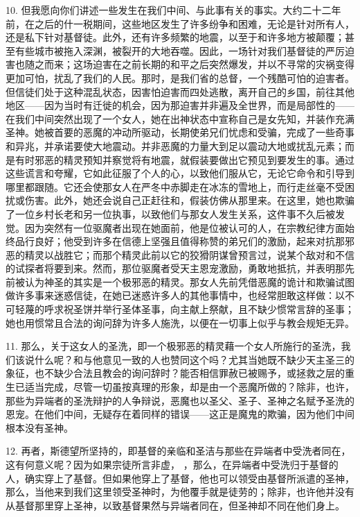 10. 但我愿向你们讲述一些发生在我们中间、与此事有关的事实。大约二十二年前，在之后的什一税期间，这些地区发生了许多纷争和困难，无论是针对所有人，还是私下针对基督徒。此外，还有许多频繁的地震，以至于和许多地方被颠覆；甚至有些城市被拖入深渊，被裂开的大地吞噬。因此，一场针对我们基督徒的严厉迫害也随之而来；这场迫害在之前长期的和平之后突然爆发，并以不寻常的灾祸变得更加可怕，扰乱了我们的人民。那时，是我们省的总督，一个残酷可怕的迫害者。但信徒们处于这种混乱状态，因害怕迫害而四处逃散，离开自己的乡国，前往其他地区——因为当时有迁徙的机会，因为那迫害并非遍及全世界，而是局部性的——在我们中间突然出现了一个女人，她在出神状态中宣称自己是女先知，并装作充满圣神。她被首要的恶魔的冲动所驱动，长期使弟兄们忧虑和受骗，完成了一些奇事和异兆，并承诺要使大地震动。并非恶魔的力量大到足以震动大地或扰乱元素；而是有时邪恶的精灵预知并察觉将有地震，就假装要做出它预见到要发生的事。通过这些谎言和夸耀，它如此征服了个人的心，以致他们服从它，无论它命令和引导到哪里都跟随。它还会使那女人在严冬中赤脚走在冰冻的雪地上，而行走丝毫不受困扰或伤害。此外，她还会说自己正赶往和，假装仿佛从那里来。在这里，她也欺骗了一位乡村长老和另一位执事，以致他们与那女人发生关系，这件事不久后被发觉。因为突然有一位驱魔者出现在她面前，他是位被认可的人，在宗教纪律方面始终品行良好；他受到许多在信德上坚强且值得称赞的弟兄们的激励，起来对抗那邪恶的精灵以战胜它；而那个精灵此前以它的狡猾阴谋曾预言过，说某个敌对和不信的试探者将要到来。然而，那位驱魔者受天主恩宠激励，勇敢地抵抗，并表明那先前被认为神圣的其实是一个极邪恶的精灵。那女人先前凭借恶魔的诡计和欺骗试图做许多事来迷惑信徒，在她已迷惑许多人的其他事情中，也经常胆敢这样做：以不可轻蔑的呼求祝圣饼并举行圣体圣事，向主献上祭献，且不缺少惯常言辞的圣事；她也用惯常且合法的询问辞为许多人施洗，以便在一切事上似乎与教会规矩无异。\par

11. 那么，关于这女人的圣洗，即一个极邪恶的精灵藉一个女人所施行的圣洗，我们该说什么呢？和与他意见一致的人也赞同这个吗？尤其当她既不缺少天主圣三的象征，也不缺少合法且教会的询问辞时？能否相信罪赦已被赐予，或拯救之层的重生已适当完成，尽管一切虽按真理的形象，却是由一个恶魔所做的？除非，也许，那些为异端者的圣洗辩护的人争辩说，恶魔也以圣父、圣子、圣神之名赋予圣洗的恩宠。在他们中间，无疑存在着同样的错误——这正是魔鬼的欺骗，因为他们中间根本没有圣神。\par

12. 再者，斯德望所坚持的，即基督的亲临和圣洁与那些在异端者中受洗者同在，这有何意义呢？因为如果宗徒所言非虚， ，那么，在异端者中受洗归于基督的人，确实穿上了基督。但如果他穿上了基督，他也可以领受由基督所派遣的圣神，那么，当他来到我们这里领受圣神时，为他覆手就是徒劳的；除非，也许他并没有从基督那里穿上圣神，以致基督果然与异端者同在，但圣神却不同在他们身上。\par

